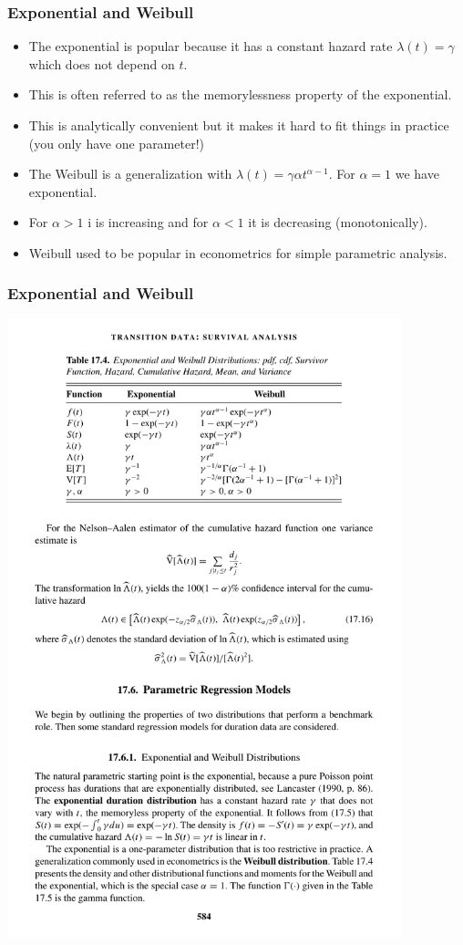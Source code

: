 \documentclass[xcolor=pdftex,dvipsnames,table,mathserif]{beamer}
\begin{document}
\begin{frame}
\frametitle{Exponential and Weibull }
\begin{itemize}
\item The exponential is popular because it has a \alert{constant hazard rate} $\lambda(t) =\gamma$ which does not depend on $t$.
\item This is often referred to as the \alert{memorylessness} property of the exponential.
\item This is analytically convenient but it makes it hard to fit things in practice (you only have one parameter!)
\item The Weibull is a generalization with $\lambda(t) = \gamma \alpha t^{\alpha-1}$. For $\alpha=1$ we have exponential.
\item For $\alpha > 1$ i is increasing and for $\alpha < 1$ it is decreasing (monotonically). 
\item Weibull used to be popular in econometrics for simple parametric analysis.
\end{itemize}
\end{frame}


\begin{frame}
\frametitle{Exponential and Weibull }
\begin{center}
\includegraphics[width=4.5in]{./resources/figure17-4.pdf}
\end{center}
\end{frame}
\end{document}
